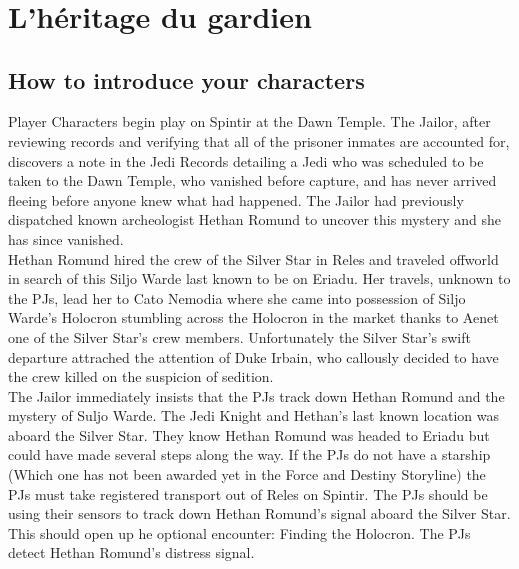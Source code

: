 \documentclass[twoside]{article}
\begin{document}
\title{\vspace{-0.5cm}{\Huge  Chroniques du gardien} \vspace{-1cm}}

\date{}
\maketitle


\section{L'héritage du gardien}
\subsection{How to introduce your characters}
Player Characters begin play on Spintir at the Dawn Temple.  The Jailor, after reviewing records and verifying that all of the prisoner inmates are accounted for, discovers a note in the Jedi Records detailing a Jedi who was scheduled to be taken to the Dawn Temple, who vanished before capture, and has never arrived fleeing before anyone knew what had happened.  The Jailor had previously dispatched known archeologist Hethan Romund to uncover this mystery and she has since vanished.\\

Hethan Romund hired the crew of the Silver Star in Reles and traveled offworld in search of this Siljo Warde last known to be on Eriadu.  Her travels, unknown to the PJs, lead her to Cato Nemodia where she came into possession of Siljo Warde's Holocron stumbling across the Holocron in the market thanks to Aenet one of the Silver Star's crew members.  Unfortunately the Silver Star's swift departure attrached the attention of Duke Irbain, who callously decided to have the crew killed on the suspicion of sedition.\\

The Jailor immediately insists that the PJs track down Hethan Romund and the mystery of Suljo Warde.  The Jedi Knight and Hethan's last known location was aboard the Silver Star.  They know Hethan Romund was headed to Eriadu but could have made several steps along the way.  If the PJs do not have a starship (Which one has not been awarded yet in the Force and Destiny Storyline) the PJs must take registered transport out of Reles on Spintir.  The PJs should be using their sensors to track down Hethan Romund's signal aboard the Silver Star.  This should open up he optional encounter: Finding the Holocron.  The PJs detect Hethan Romund's distress signal.\\
\end{document}
